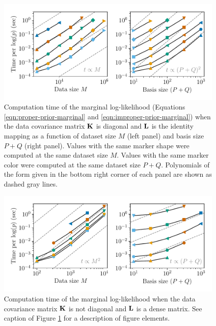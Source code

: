 \documentclass[manuscript]{aastex62}
\newcommand{\vx}[1]{{\bf {#1}}}
\begin{document}
\begin{figure}
  \includegraphics{uncorr_no_L_scaling.pdf}
  \caption{Computation time of the marginal log-likelihood (Equations \ref{eqn:proper-prior-marginal} and \ref{eqn:improper-prior-marginal}) when the data covariance matrix $\vx{K}$ is diagonal and $\vx{L}$ is the identity mapping as a function of dataset size $M$ (left panel) and basis size $P+Q$ (right panel). Values with the same marker shape were computed at the same dataset size $M$. Values with the same marker color were computed at the same dataset size $P+Q$. Polynomials of the form given in the bottom right corner of each panel are shown as dashed gray lines.}
  \label{fig:uncorr-no-L-logp}
\end{figure}

\begin{figure}
  \includegraphics{corr_yes_L_scaling.pdf}
  \caption{Computation time of the marginal log-likelihood when the data covariance matrix $\vx{K}$ is not diagonal and $\vx{L}$ is a dense matrix. See caption of Figure \ref{fig:uncorr-no-L-logp} for a description of figure elements.}
  \label{fig:corr-yes-L-logp}
\end{figure}
\end{document}
